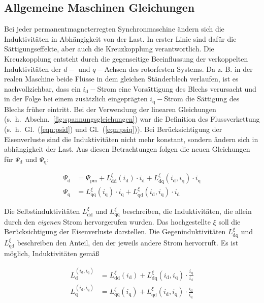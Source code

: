 \documentclass[conference,twocolumn]{IEEEtran}
\newcommand{\x}[1]{\mathrm{#1}}
\begin{document}
\subsection{Allgemeine Maschinen Gleichungen}\label{sec:allg-gleichungen}

Bei jeder permanentmagneterregten Synchronmaschine ändern sich die Induktivitäten in Abhängigkeit von der Last.
In erster Linie sind dafür die Sättigungseffekte, aber auch die Kreuzkopplung verantwortlich.
Die Kreuzkopplung entsteht durch die gegenseitige Beeinflussung der verkoppelten Induktivitäten der $d-$ und $q-$Achsen des rotorfesten Systems.
Da z. B. in der realen Maschine beide Flüsse in dem gleichen Ständerblech verlaufen, ist es nachvollziehbar, dass ein $i_\x{d}-$Strom eine Vorsättigung des Blechs verursacht und in der Folge bei einem zusätzlich eingeprägten $i_\x{q}-$Strom die Sättigung des Blechs früher eintritt.
Bei der Verwendung der linearen Gleichungen (s.~h.~Abschn.~\ref{fig:spannungsgleichungen}) war die Definition des Flussverkettung (s.~h.~Gl.~(\ref{eqn:psid}) und Gl.~(\ref{eqn:psiq})).
Bei Berücksichtigung der Eisenverluste sind die Induktivitäten nicht mehr konstant, sondern ändern sich in abhängigkeit der Last.
Aus diesen Betrachtungen folgen die neuen Gleichungen für $\Psi_\x{d}$ und $\Psi_\x{q}$:

\begin{align}
\Psi_\x{d} &= \Psi_\x{pm} + L_\x{dd}^{\xi}(i_\x{d})\cdot i_\x{d} + L_\x{dq}^{\xi}(i_\x{d} ,i_\x{q})\cdot i_\x{q} \\
\Psi_\x{q} &= L_\x{qq}^{\xi}(i_\x{q})\cdot i_\x{q} + L_\x{qd}^{\xi}(i_\x{d} ,i_\x{q})\cdot i_\x{d}
\end{align}

Die Selbstinduktivitäten $L_\x{dd}^{\xi}$ und $L_\x{qq}^{\xi}$ beschreiben, die Induktivitäten, die allein durch den \emph{eigenen} Strom hervorgerufen wurden.
Das hochgestellte $\xi$ soll die Berücksichtigung der Eisenverluste darstellen.
Die Gegeninduktivitäten $L_\x{dq}^{\xi}$ und $L_\x{qd}^{\xi}$ beschreiben den Anteil, den der jeweils andere Strom hervorruft.
Es ist möglich, Induktivitäten gemäß \textcite{Kellner2012}

\begin{align}
	L_\x{d}^{(i_\x{d},i_\x{q})}	&=	L_\x{dd}^{\xi}(i_\x{d})+L_\x{dq}^{\xi}(i_\x{d},i_\x{q})\cdot\frac{i_\x{q}}{i_\x{d}} \label{eqn:induktiv-neu-1} \\
	L_\x{q}^{(i_\x{d},i_\x{q})}	&=	L_\x{qq}^{\xi}(i_\x{q})+L_\x{qd}^{\xi}(i_\x{d},i_\x{q})\cdot\frac{i_\x{d}}{i_\x{q}} \label{eqn:induktiv-neu-2}
\end{align}
\end{document}
